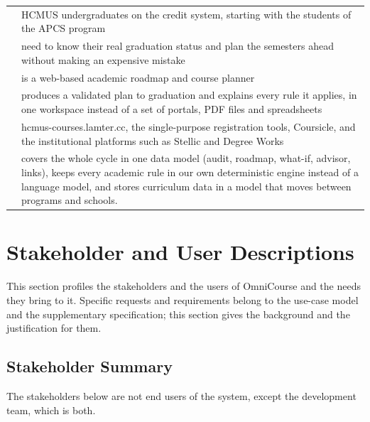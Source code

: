 \documentclass{article}
\begin{document}
{\small
\begin{xltabular}{\dimexpr{}\tabcolsep\relax}{@{}>{\RaggedRight\arraybackslash}p{4.0cm}Y@{}}
 & HCMUS undergraduates on the credit system, starting with the students of the APCS
program\\
 & need to know their real graduation status and plan the semesters ahead without making an
expensive mistake\\
 & is a web-based academic roadmap and course planner\\
 & produces a validated plan to graduation and explains every rule it applies, in one
workspace instead of a set of portals, PDF files and spreadsheets\\
 & hcmus-courses.lamter.cc, the single-purpose registration tools, Coursicle, and the
institutional platforms such as Stellic and Degree Works\\
 & covers the whole cycle in one data model (audit, roadmap, what-if, advisor,
links), keeps every academic rule in our own deterministic engine instead of a language model, and stores curriculum data
in a model that moves between programs and schools.\\
\end{xltabular}}

\section{Stakeholder and User Descriptions}
This section profiles the stakeholders and the users of OmniCourse and the needs they bring to it. Specific requests and
requirements belong to the use-case model and the supplementary specification; this section gives the background and the
justification for them.

\subsection{Stakeholder Summary}
The stakeholders below are not end users of the system, except the development team, which is both.
\end{document}

